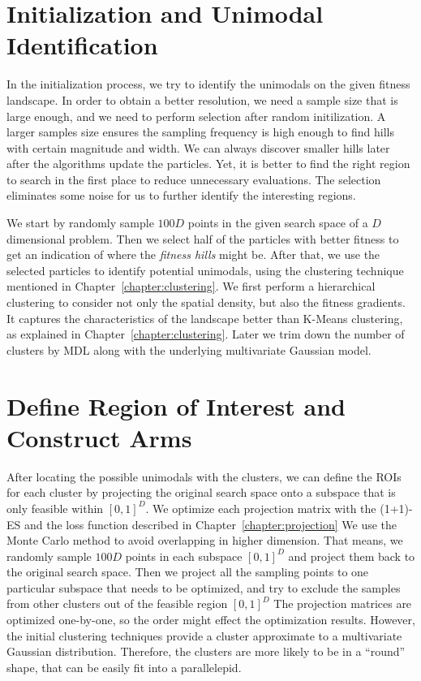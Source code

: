 \section{Initialization and Unimodal Identification}

In the initialization process, we try to identify the unimodals on the given fitness landscape.
In order to obtain a better resolution, we need a sample size that is large enough, and we need to perform selection after random initilization.
A larger samples size ensures the sampling frequency is high enough to find hills with certain magnitude and width.
We can always discover smaller hills later after the algorithms update the particles.
Yet, it is better to find the right region to search in the first place to reduce unnecessary evaluations.
The selection eliminates some noise for us to further identify the interesting regions.

We start by randomly sample $100D$ points in the given search space of a $D$ dimensional problem. 
Then we select half of the particles with better fitness to get an indication of where the \textit{fitness hills} might be.
After that, we use the selected particles to identify potential unimodals,
using the clustering technique mentioned in Chapter~\ref{chapter:clustering}.
We first perform a hierarchical clustering to consider not only the spatial density, but also the fitness gradients.
It captures the characteristics of the landscape better than K-Means clustering, as explained in Chapter~\ref{chapter:clustering}.
Later we trim down the number of clusters by MDL along with the underlying multivariate Gaussian model.



\section{Define Region of Interest and Construct Arms}

After locating the possible unimodals with the clusters, we can define the ROIs for each cluster 
by projecting the original search space onto a subspace that is only feasible within $[0,1]^D$.
We optimize each projection matrix with the (1+1)-ES and the loss function described in Chapter~\ref{chapter:projection} 
We use the Monte Carlo method to avoid overlapping in higher dimension.
That means, we randomly sample $100D$ points in each subspace $[0,1]^D$ and project them back to the original search space.
Then we project all the sampling points to one particular subspace that needs to be optimized, 
and try to exclude the samples from other clusters out of the feasible region $[0,1]^D$
The projection matrices are optimized one-by-one, so the order might effect the optimization results.
However, the initial clustering techniques provide a cluster approximate to a multivariate Gaussian distribution.
Therefore, the clusters are more likely to be in a ``round'' shape, that can be easily fit into a parallelepid.  


